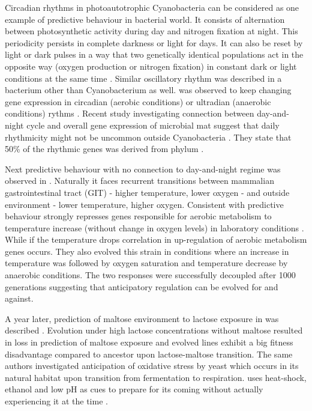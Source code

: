 Circadian rhythms in photoautotrophic Cyanobacteria can be considered as one example of predictive behaviour in bacterial world.
It consists of alternation between photosynthetic activity during day and nitrogen fixation at night.
This periodicity persists in complete darkness or light for days.
It can also be reset by light or dark pulses in a way that two genetically identical populations act in the opposite way (oxygen production or nitrogen fixation) in constant dark or light conditions at the same time \cite{kondo1993circadian}.
Similar oscillatory rhythm was described in a bacterium other than Cyanobacterium as well.
 was observed to keep changing gene expression in circadian (aerobic conditions) or ultradian (anaerobic conditions) rythms \cite{min2005rhythmic}.
Recent study investigating connection between day-and-night cycle and overall gene expression of microbial mat suggest that daily rhythmicity might not be uncommon outside Cyanobacteria \cite{hornlein2018daily}.
They state that 50\% of the rhythmic genes was derived from phylum .

Next predictive behaviour with no connection to day-and-night regime was observed in .
Naturally it faces recurrent transitions between mammalian gastrointestinal tract (GIT) - higher temperature, lower oxygen - and outside environment - lower temperature, higher oxygen.
Consistent with predictive behaviour  strongly represses genes responsible for aerobic metabolism to temperature increase (without change in oxygen levels) in laboratory conditions \cite{tagkopoulos2008predictive}.
While if the temperature drops correlation in up-regulation of aerobic metabolism genes occurs.
They also evolved this strain in conditions where an increase in temperature was followed by oxygen saturation and temperature decrease by anaerobic conditions.
The two responses were successfully decoupled after 1000 generations suggesting that anticipatory regulation can be evolved for and against.

A year later, prediction of maltose environment to lactose exposure in  was described \cite{mitchell2009adaptive}.
Evolution under high lactose concentrations without maltose resulted in loss in prediction of maltose exposure and evolved lines exhibit a big fitness disadvantage compared to ancestor upon lactose-maltose transition.
The same authors investigated anticipation of oxidative stress by yeast which occurs in its natural habitat upon transition from fermentation to respiration.
 uses heat-shock, ethanol and low pH as cues to prepare for its coming without actually experiencing it at the time \cite{mitchell2009adaptive}.


